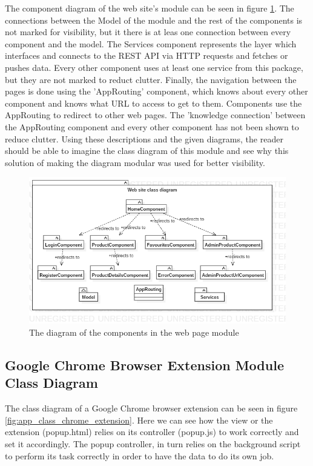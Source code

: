 \documentclass[12pt,a4paper,twoside]{report}
\begin{document}
The component diagram of the web site's module can be seen in figure \ref{fig:app_class_angular_components}. The connections between the Model of the module and the rest of the components is not marked for visibility, but it there is at leas one connection between every component and the model. The Services component represents the layer which interfaces and connects to the REST API via HTTP requests and fetches or pushes data. Every other component uses at least one service from this package, but they are not marked to reduct clutter. Finally, the navigation between the pages is done using the 'AppRouting' component, which knows about every other component and knows what URL to access to get to them. Components use the AppRouting to redirect to other web pages. The 'knowledge connection' between the AppRouting component and every other component has not been shown to reduce clutter. Using these descriptions and the given diagrams, the reader should be able to imagine the class diagram of this module and see why this solution of making the diagram modular was used for better visibility.

\begin{figure}[ht]
  \centering
  \includegraphics[width=0.75\linewidth]{img/app_class_angular_components.png}
  \caption{The diagram of the components in the web page module}
  \label{fig:app_class_angular_components}
\end{figure}


\subsection{Google Chrome Browser Extension Module Class Diagram}

The class diagram of a Google Chrome browser extension can be seen in figure \ref{fig:app_class_chrome_extension}. Here we can see how the view or the extension (popup.html) relies on its controller (popup.js) to work correctly and set it accordingly. The popup controller, in turn relies on the background script to perform its task correctly in order to have the data to do its own job.
\end{document}
